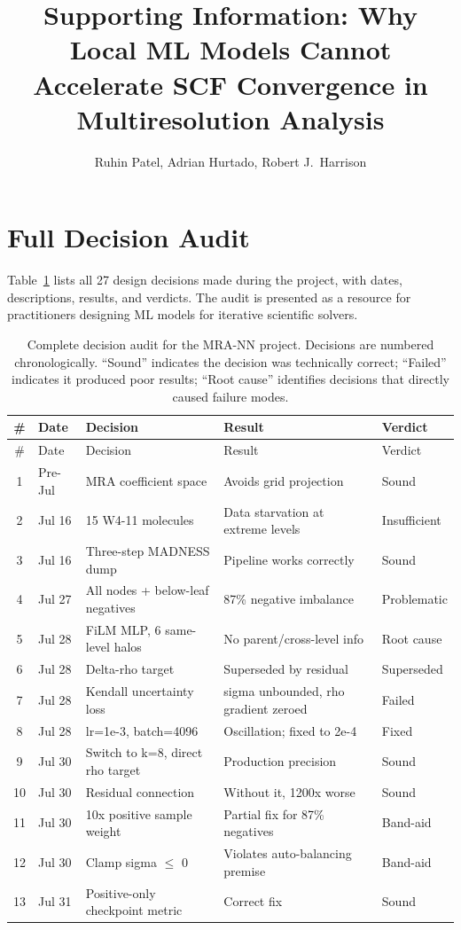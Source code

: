 \documentclass[journal=jctcce]{achemso}
\title{Supporting Information: Why Local ML Models Cannot Accelerate
SCF Convergence in Multiresolution Analysis}
\author{Ruhin Patel, Adrian Hurtado, Robert J.~Harrison}
\begin{document}
\section{Full Decision Audit}

Table~\ref{tab:decisions} lists all 27 design decisions made during
the project, with dates, descriptions, results, and verdicts. The
audit is presented as a resource for practitioners designing ML
models for iterative scientific solvers.

\begin{longtable}{clp{5cm}p{4cm}l}
\caption{Complete decision audit for the MRA-NN project. Decisions
are numbered chronologically. ``Sound'' indicates the decision was
technically correct; ``Failed'' indicates it produced poor results;
``Root cause'' identifies decisions that directly caused failure modes.}
\label{tab:decisions} \\
\toprule
\# & Date & Decision & Result & Verdict \\
\midrule
\endfirsthead
\midrule
\# & Date & Decision & Result & Verdict \\
\midrule
\endhead
1 & Pre-Jul & MRA coefficient space & Avoids grid projection & Sound \\
2 & Jul 16 & 15 W4-11 molecules & Data starvation at extreme levels & Insufficient \\
3 & Jul 16 & Three-step MADNESS dump & Pipeline works correctly & Sound \\
4 & Jul 27 & All nodes + below-leaf negatives & 87\% negative imbalance & Problematic \\
5 & Jul 28 & FiLM MLP, 6 same-level halos & No parent/cross-level info & Root cause \\
6 & Jul 28 & Delta-rho target & Superseded by residual & Superseded \\
7 & Jul 28 & Kendall uncertainty loss & sigma unbounded, rho gradient zeroed & Failed \\
8 & Jul 28 & lr=1e-3, batch=4096 & Oscillation; fixed to 2e-4 & Fixed \\
9 & Jul 30 & Switch to k=8, direct rho target & Production precision & Sound \\
10 & Jul 30 & Residual connection & Without it, 1200x worse & Sound \\
11 & Jul 30 & 10x positive sample weight & Partial fix for 87\% negatives & Band-aid \\
12 & Jul 30 & Clamp sigma $\leq$ 0 & Violates auto-balancing premise & Band-aid \\
13 & Jul 31 & Positive-only checkpoint metric & Correct fix & Sound \\

\end{longtable}
\end{document}
